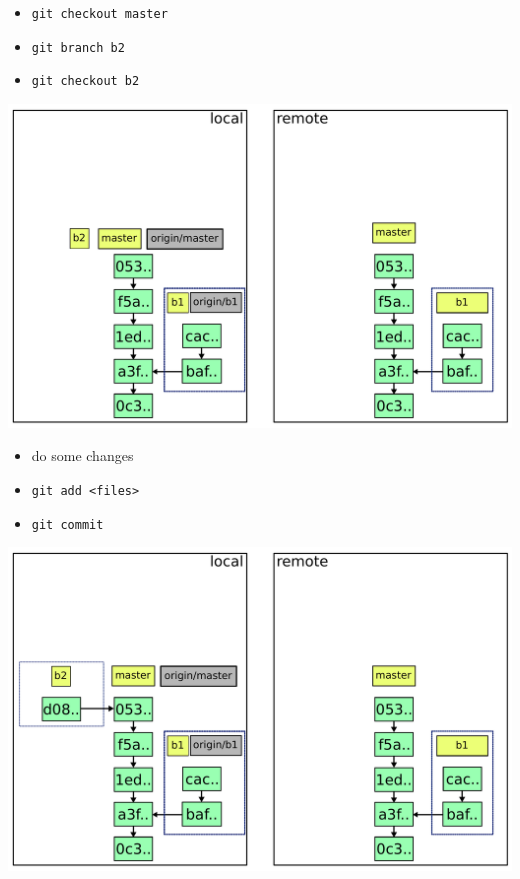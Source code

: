 \documentclass{beamer}
\begin{document}
\begin{frame}{}
  \begin{itemize}
  \item \lstinline|git checkout master|
  \item \lstinline|git branch b2|
  \item \lstinline|git checkout b2|
  \end{itemize}
\end{frame}

\begin{frame}{}
  \includegraphics[width=\textwidth]{img/3.pdf}
\end{frame}

\begin{frame}{}
  \begin{itemize}
  \item do some changes
  \item \lstinline|git add <files>|
  \item \lstinline|git commit|
  \end{itemize}
\end{frame}

\begin{frame}{}
  \includegraphics[width=\textwidth]{img/3-bis.pdf}
\end{frame}
\end{document}

